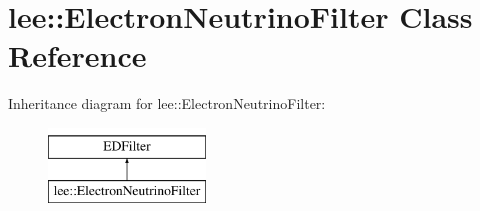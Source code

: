 \hypertarget{classlee_1_1ElectronNeutrinoFilter}{\section{lee\-:\-:Electron\-Neutrino\-Filter Class Reference}
\label{classlee_1_1ElectronNeutrinoFilter}
}
Inheritance diagram for lee\-:\-:Electron\-Neutrino\-Filter\-:\begin{figure}[H]
\begin{center}
\leavevmode
\includegraphics[height=2.000000cm]{classlee_1_1ElectronNeutrinoFilter}
\end{center}
\end{figure}
